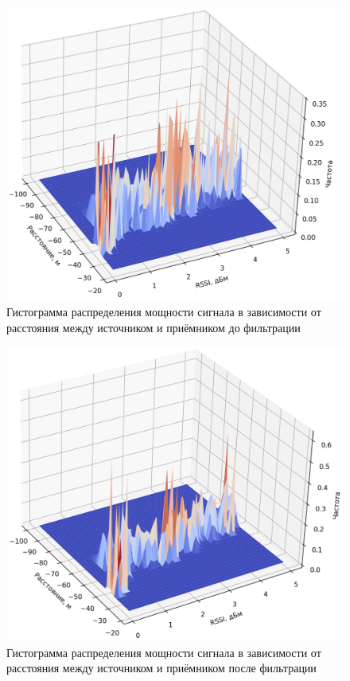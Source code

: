 \begin{figure}[H]
	\centering
	\includegraphics[width=\textwidth]{assets/hist.png}
	\caption{Гистограмма распределения мощности сигнала в зависимости от расстояния между источником и приёмником до фильтрации}
	\label{fig:hist}
\end{figure}

\begin{figure}[H]
	\centering
	\includegraphics[width=\textwidth]{assets/hist-filtered.png}
	\caption{Гистограмма распределения мощности сигнала в зависимости от расстояния между источником и приёмником после фильтрации}
	\label{fig:hist-filtered}
\end{figure}

